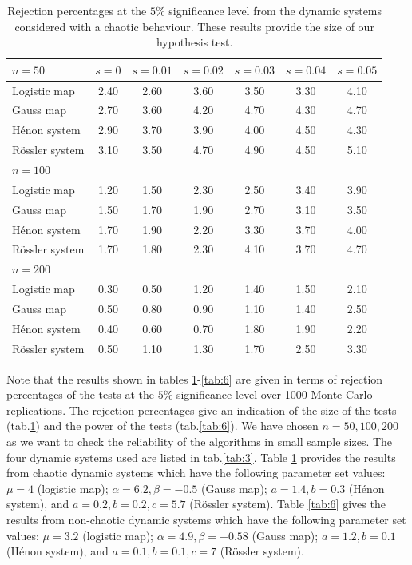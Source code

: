 \begin{table}[ht!]
\centering
\begin{adjustbox}{width=\textwidth}
\begin{tabular}{l|cccccc}
\hline 
$n=50$ &  $s=0$      & $s=0.01$  & $s=0.02$  & $s=0.03$      & $s=0.04$  & $s=0.05$  \\ \hline
Logistic map    & 2.40 & 2.60 & 3.60 & 3.50 & 3.30 & 4.10 \\ 
Gauss map          & 2.70 & 3.60 & 4.20 & 4.70 & 4.30 & 4.70\\ 
H\'enon  system   & 2.90 & 3.70 & 3.90 & 4.00 & 4.50 & 4.30\\ 
R\"ossler  system       & 3.10 & 3.50 & 4.70 & 4.90 & 4.50 & 5.10\\ \hline
$n=100$ &        &   &   &       &   &   \\ \hline
Logistic map        & 1.20 & 1.50 & 2.30 & 2.50 & 3.40 & 3.90\\ 
Gauss map             & 1.50 & 1.70 & 1.90 & 2.70 & 3.10 & 3.50\\ 
H\'enon  system      & 1.70 & 1.90 & 2.20 & 3.30 & 3.70 & 4.00\\
R\"ossler  system        & 1.70 & 1.80 & 2.30 & 4.10 & 3.70 & 4.70\\ \hline
$n=200$ &        &   &   &       &   &   \\ \hline
Logistic map       & 0.30 & 0.50 & 1.20 & 1.40 & 1.50 & 2.10\\ 
Gauss map            & 0.50 & 0.80 & 0.90 & 1.10 & 1.40 & 2.50\\ 
H\'enon  system     & 0.40 & 0.60 & 0.70 & 1.80 & 1.90 & 2.20\\ 
R\"ossler  system       & 0.50 & 1.10 & 1.30 & 1.70 & 2.50 & 3.30\\ \hline
\end{tabular}
\end{adjustbox}
\caption{\label{tab:5} Rejection percentages at the $5\%$ significance level from the dynamic systems considered with a chaotic behaviour. These results provide the size of our hypothesis test.}
\end{table}
\newpage
Note that the results shown in tables \ref{tab:5}-\ref{tab:6} are given in terms of rejection percentages of the tests at the $5\%$ significance level over 1000 Monte Carlo replications. The rejection percentages give an indication of the size of the tests (tab.\ref{tab:5}) and the power of the tests (tab.\ref{tab:6}). We have chosen $n=50, 100, 200$ as we want to check the reliability of the algorithms in small sample sizes. The four dynamic systems used are listed in tab.\ref{tab:3}. Table \ref{tab:5} provides the results from chaotic dynamic systems which have the following parameter set values: $\mu=4$ (logistic map); $\alpha=6.2, \beta=-0.5$ (Gauss map); $a=1.4, b=0.3$ (H\'enon system), and $a=0.2, b=0.2, c=5.7$ (R\"ossler system). Table \ref{tab:6} gives the results from non-chaotic dynamic systems which have the following parameter set values: $\mu=3.2$ (logistic map); $\alpha=4.9, \beta=-0.58$ (Gauss map); $a=1.2, b=0.1$ (H\'enon system), and $a=0.1, b=0.1, c=7$ (R\"ossler system).

